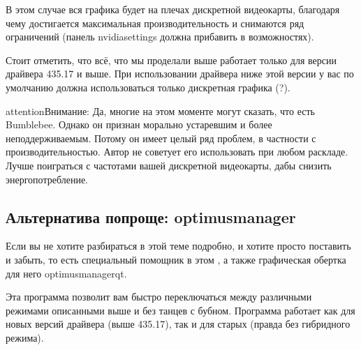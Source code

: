 \documentclass[letterpaper,10pt,russian,openany]{sphinxmanual}
\begin{document}
\sphinxAtStartPar
В этом случае вся графика будет на плечах дискретной видеокарты, благодаря
чему достигается максимальная производительность и снимаются ряд ограничений
(панель nvidia\sphinxhyphen{}settings должна прибавить в возможностях).

\sphinxAtStartPar
Стоит отметить, что всё, что мы проделали выше \sphinxhyphen{} работает только для версии драйвера 435.17 и выше.
При использовании драйвера ниже этой версии у вас по умолчанию должна использоваться только дискретная графика (?).

\begin{sphinxadmonition}{attention}{Внимание:}
\sphinxAtStartPar
Да, многие на этом моменте могут сказать, что есть Bumblebee. Однако он признан морально устаревшим
и более неподдерживаемым. Потому он имеет целый ряд проблем, в частности с производительностью. Автор не советует
его использовать при любом раскладе. Лучше поиграться с частотами вашей дискретной видеокарты, дабы снизить энергопотребление.
\end{sphinxadmonition}

\ignorespaces 

\subsection{Альтернатива попроще: optimus\sphinxhyphen{}manager}
\label{\detokenize{source/first-steps:optimus-manager}}\label{\detokenize{source/first-steps:index-12}}\label{\detokenize{source/first-steps:id12}}
\sphinxAtStartPar
Если вы не хотите разбираться в этой теме подробно, и хотите просто поставить и забыть, то
есть специальный помощник в этом \sphinxhyphen{} ,
а также графическая обертка для него optimus\sphinxhyphen{}manager\sphinxhyphen{}qt.

\sphinxAtStartPar
Эта программа позволит вам быстро переключаться между различными режимами описанными выше и без танцев с бубном.
Программа работает как для новых версий драйвера (выше 435.17), так и для старых (правда без гибридного режима).

\noindent{}

\sphinxAtStartPar
{}
\end{document}
